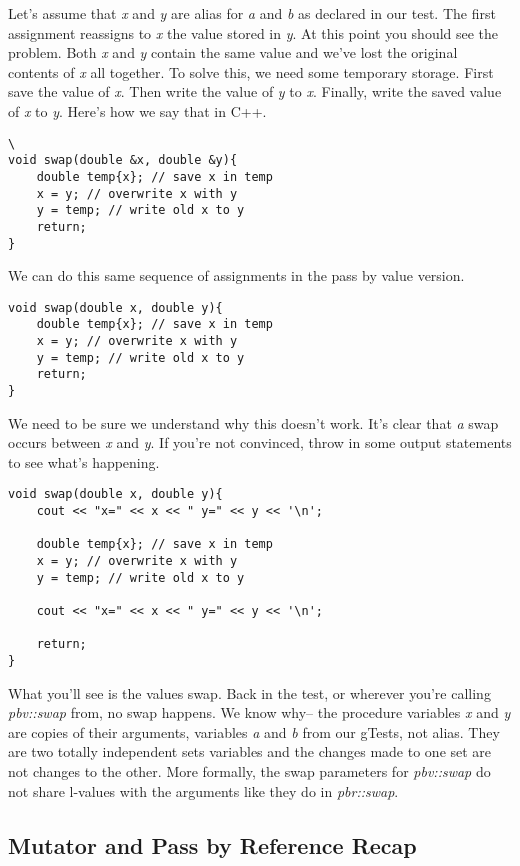 \documentclass[]{tufte-handout}
\begin{document}
Let's assume that \textit{x} and \textit{y} are alias for \textit{a} and \textit{b} as declared in our test. The first assignment reassigns to \textit{x} the value stored in \textit{y}. At this point you should see the problem. Both \textit{x} and \textit{y} contain the same value and we've lost the original contents of \textit{x} all together. To solve this, we need some temporary storage. First save the value of \textit{x}. Then write the value of \textit{y} to \textit{x}. Finally, write the saved value of \textit{x} to \textit{y}. Here's how we say that in C++.
\begin{verbatim}\
void swap(double &x, double &y){
	double temp{x}; // save x in temp
	x = y; // overwrite x with y
	y = temp; // write old x to y
	return;
}
\end{verbatim}

We can do this same sequence of assignments in the pass by value version. 
\begin{verbatim}
void swap(double x, double y){
	double temp{x}; // save x in temp
	x = y; // overwrite x with y
	y = temp; // write old x to y
	return;
}
\end{verbatim}
We need to be sure we understand why this doesn't work.  It's clear that \textit{a} swap occurs between \textit{x} and \textit{y}.  If you're not convinced, throw in some output statements to see what's happening.
\begin{verbatim}
void swap(double x, double y){
	cout << "x=" << x << " y=" << y << '\n';

	double temp{x}; // save x in temp
	x = y; // overwrite x with y
	y = temp; // write old x to y

	cout << "x=" << x << " y=" << y << '\n';
	
	return;
}
\end{verbatim}
What you'll see is the values swap.  Back in the test, or wherever you're calling \textit{pbv::swap} from, no swap happens. We know why-- the procedure variables \textit{x} and \textit{y} are copies of their arguments, variables \textit{a} and \textit{b} from our gTests, not alias. They are two totally independent sets variables and the changes made to one set are not changes to the other.  More formally, the swap parameters for \textit{pbv::swap} do not share l-values with the arguments like they do in \textit{pbr::swap}.

\subsection{ Mutator and Pass by Reference Recap }
\end{document}
